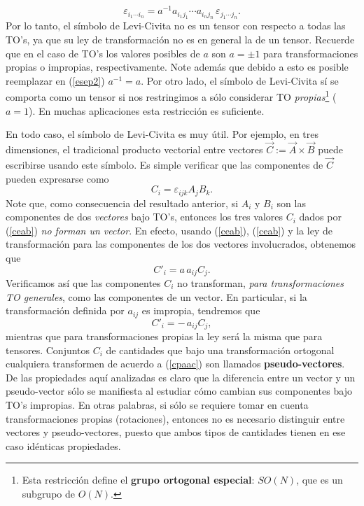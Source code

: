\begin{equation}\label{esep2}
\boxed{\varepsilon_{i_1\cdots i_n} =a^{-1}a_{i_1j_1}\cdots a_{i_nj_n}\,\varepsilon_{j_1\cdots j_n}.}
\end{equation}
Por lo tanto, el símbolo de Levi-Civita no es un tensor con respecto a todas las TO's, ya que su ley de transformación no es en general la de un tensor. Recuerde que en el caso de TO's los valores posibles de $a$ son $a=\pm 1$ para transformaciones propias o impropias, respectivamente. Note además que debido a esto es posible reemplazar en (\ref{esep2}) $a^{-1}=a$. Por otro lado, el símbolo de Levi-Civita sí se comporta como un tensor si nos restringimos a sólo considerar TO \textit{propias}\footnote{Esta restricción define el \textbf{grupo ortogonal especial}: $SO(N)$, que es un subgrupo de $O(N)$.} ($a=1$). En muchas aplicaciones esta restricción es suficiente.

En todo caso, el símbolo de Levi-Civita es muy útil. Por ejemplo, en tres dimensiones, el tradicional producto vectorial entre vectores $\vec{C}:=\vec{A}\times\vec{B}$ puede escribirse usando este símbolo. Es simple verificar que las componentes de $\vec{C}$ pueden expresarse como
\begin{equation}\label{ceab}
C_i=\varepsilon_{ijk}A_jB_k.
\end{equation}
Note que, como consecuencia del resultado anterior, si $A_i$ y $B_i$ son las componentes de dos \textit{vectores} bajo TO's, entonces los tres valores $C_i$ dados por (\ref{ceab}) \textit{no forman un vector}. En efecto, usando (\ref{ceab}), (\ref{ceab}) y la ley de transformación para las componentes de los dos vectores involucrados, obtenemos que
\begin{equation}\label{cpaac}
C'_i=a\,a_{ij}C_j.
\end{equation}
Verificamos así que las componentes $C_i$ no transforman, \textit{para transformaciones TO generales}, como las componentes de un vector. En particular, si la transformación definida por $a_{ij}$ es impropia, tendremos que
\begin{equation}\label{cpaac2}
C'_i=-\,a_{ij}C_j,
\end{equation}
mientras que para transformaciones propias la ley será la misma que para tensores. Conjuntos $C_i$ de cantidades que bajo una transformación ortogonal cualquiera transformen de acuerdo a (\ref{cpaac}) son llamados \textbf{pseudo-vectores}. De las propiedades aquí analizadas es claro que la diferencia entre un vector y un pseudo-vector sólo se manifiesta al estudiar cómo cambian sus componentes bajo TO's impropias. En otras palabras, si sólo se requiere tomar en cuenta transformaciones propias (rotaciones), entonces no es necesario distinguir entre vectores y pseudo-vectores, puesto que ambos tipos de cantidades tienen en ese caso idénticas propiedades.

